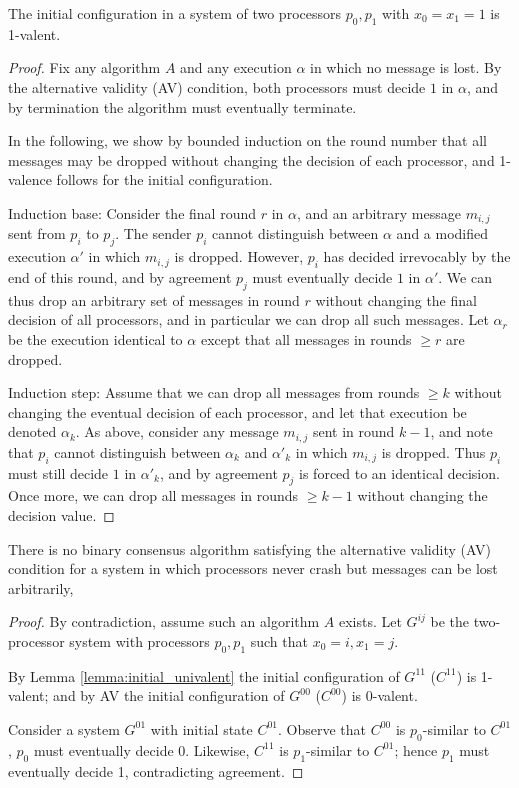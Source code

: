 \begin{lemma} \label{lemma:initial_univalent}
The initial configuration in a system of two processors $p_0, p_1$ with $x_0 = x_1 = 1$
is 1-valent.
\end{lemma}

\begin{proof}
Fix any algorithm $A$ and any execution $\alpha$ in which no message is lost.
By the alternative validity (AV) condition, both processors must decide $1$
in $\alpha$, and by termination the algorithm must eventually terminate.

In the following, we show by bounded induction on the round number that all 
messages may be dropped without changing the decision of each
processor, and 1-valence follows for the initial configuration.

Induction base: Consider the final round $r$ in $\alpha$, and an arbitrary
message $m_{i,j}$ sent from $p_i$ to $p_j$. The sender $p_i$ cannot distinguish
between $\alpha$ and a modified execution $\alpha'$ in which $m_{i,j}$ is dropped.
However, $p_i$ has decided irrevocably by the end of this round, and by agreement
$p_j$ must eventually decide $1$ in $\alpha'$.
We can thus drop an arbitrary set of messages in round $r$ without changing the
final decision of all processors, and in particular we can drop all such messages.
Let $\alpha_r$ be the execution identical to $\alpha$ except that all messages 
in rounds $\geq r$ are dropped.

Induction step: Assume that we can drop all messages from rounds $\geq k$ without
changing the eventual decision of each processor, and let
that execution be denoted $\alpha_k$. As above, consider any message $m_{i,j}$
sent in round $k-1$,
and note that $p_i$ cannot distinguish between $\alpha_k$ and $\alpha'_k$ in
which $m_{i,j}$ is dropped. Thus $p_i$ must still decide $1$ in $\alpha'_k$,
and by agreement $p_j$ is forced to an identical decision. Once more, we can 
drop all messages in rounds $\geq {k-1}$ without changing the decision value.
\end{proof}

\begin{theorem} \label{thm:no_av_consensus}
There is no binary consensus algorithm satisfying the alternative validity (AV)
condition for a system in which processors never crash but messages can be
lost arbitrarily,
\end{theorem}

\begin{proof}
By contradiction, assume such an algorithm $A$ exists.
Let $G^{ij}$ be the two-processor system with processors
$p_0, p_1$ such that $x_0 = i, x_1 = j$.

By Lemma \ref{lemma:initial_univalent} the initial configuration of
$G^{11}$ ($C^{11}$) is 1-valent; and by AV the initial configuration
of $G^{00}$ ($C^{00}$) is 0-valent.

Consider a system $G^{01}$ with initial state $C^{01}$.
Observe that $C^{00}$ is $p_0$-similar to $C^{01}$, $p_0$ must eventually decide 0.
Likewise, $C^{11}$ is $p_1$-similar to $C^{01}$; hence $p_1$ must eventually
decide 1, contradicting agreement.
\end{proof}

